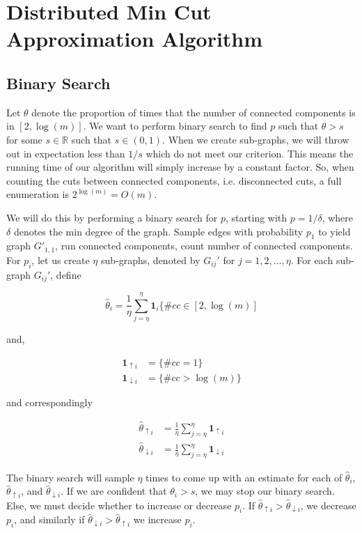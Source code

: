 \documentclass{article}
\begin{document}
\section{Distributed Min Cut Approximation Algorithm}

\subsection{Binary Search}

Let $\theta$ denote the proportion of times that the number of connected components is in $[2, \log(m)]$. We want to perform binary search to find $p$ such that $\theta > s$ for some 
$s \in \mathbb{R}$ such that $s \in (0,1)$. When we create sub-graphs, we will throw out in expectation less than $1/s$ which do not meet our criterion. This means the running time of our algorithm will simply increase by a constant factor. So, when counting the cuts between connected components, i.e. disconnected cuts, a full enumeration is $2^{\log(m)} = O(m)$. 

We will do this by performing a binary search for $p$, starting with $p = 1/\delta$, where $\delta$ denotes the min degree of the graph. Sample edges with probability $p_1$ to yield graph $G'_{1,1}$, run connected components, count number of connected components. For $p_i$, let us create $\eta$ sub-graphs, denoted by $G_{ij}' $ for 
$j = 1, 2, \ldots, \eta$. For each sub-graph $G_{ij}'$, define

\[
\hat{\theta}_i = \frac{1}{\eta} \sum_{j=\eta}^\eta \boldsymbol{1}_i\{\#cc \in [2, \log(m)]
\]

and,

\begin{align*}
\boldsymbol{1}_{\uparrow i} &= \{\# cc = 1\} \\
\boldsymbol{1}_{\downarrow i} &= \{\# cc > \log(m)\}
\end{align*}

and correspondingly

\begin{align*}
\hat{\theta}_{\uparrow i} &= \frac{1}{\eta} \sum_{j=\eta}^\eta \boldsymbol{1}_{\uparrow i} \\
\hat{\theta}_{\downarrow i} &= \frac{1}{\eta} \sum_{j=\eta}^\eta \boldsymbol{1}_{\downarrow i} 
\end{align*}

The binary search will sample $\eta$ times to come up with an estimate for each of $\hat{\theta}_i$, $\hat{\theta}_{\uparrow i}$, and $\hat{\theta}_{\downarrow i}$. If we are confident that $\theta_i > s$, we may stop our binary search. Else, we must decide whether to increase or decrease $p_i$. If 
$\hat{\theta}_{\uparrow i} > \hat{\theta}_{\downarrow i}$, we decrease $p_i$, and similarly if 
$\hat{\theta}_{\downarrow i} > \hat{\theta}_{\uparrow i}$ we increase $p_i$.
\end{document}
